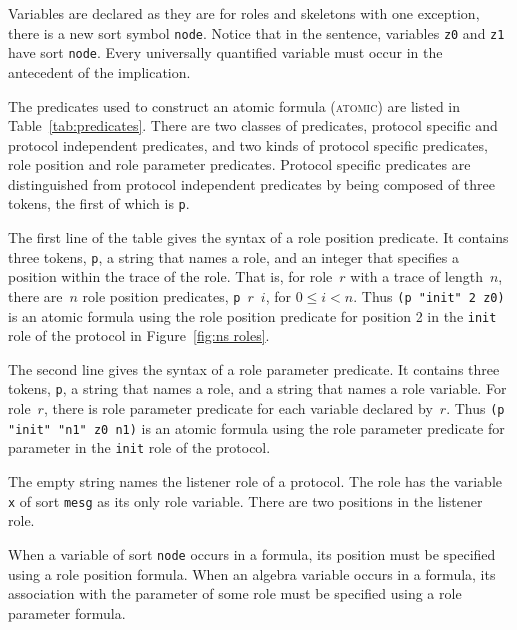 \documentclass[12pt]{article}
\newcommand{\sym}[1]{\textup{\texttt{#1}}}
\begin{document}
Variables are declared as they are for roles and skeletons with one
exception, there is a new sort symbol \sym{node}.  Notice that in the
sentence, variables \sym{z0} and \sym{z1} have sort \sym{node}.  Every
universally quantified variable must occur in the antecedent of the
implication.

The predicates used to construct an atomic formula (\textsc{atomic})
are listed in Table~\ref{tab:predicates}.  There are two classes of
predicates, protocol specific and protocol independent predicates, and
two kinds of protocol specific predicates, role position and role
parameter predicates.  Protocol specific predicates are distinguished
from protocol independent predicates by being composed of three
tokens, the first of which is \texttt{p}.

The first line of the table gives the syntax of a role position
predicate.  It contains three tokens, \texttt{p}, a string that names
a role, and an integer that specifies a position within the trace of
the role.  That is, for role~$r$ with a trace of length~$n$, there
are~$n$ role position predicates, \mbox{\texttt{p} $r$ $i$}, for
$0\leq i < n$.  Thus \verb|(p "init" 2 z0)| is an atomic formula using
the role position predicate for position 2 in the \texttt{init} role
of the protocol in Figure~\ref{fig:ns roles}.

The second line gives the syntax of a role parameter predicate.  It
contains three tokens, \texttt{p}, a string that names a role, and a
string that names a role variable.  For role~$r$, there is role
parameter predicate for each variable declared by~$r$.  Thus
\verb|(p "init" "n1" z0 n1)| is an atomic formula using the role
parameter predicate for parameter  in the \texttt{init} role
of the protocol.

The empty string names the listener role of a protocol.  The role
has the variable \texttt{x} of sort \texttt{mesg} as its only role
variable.  There are two positions in the listener role.

When a variable of sort \sym{node} occurs in a formula, its position
must be specified using a role position formula.  When an algebra
variable occurs in a formula, its association with the parameter of
some role must be specified using a role parameter formula.
\end{document}
